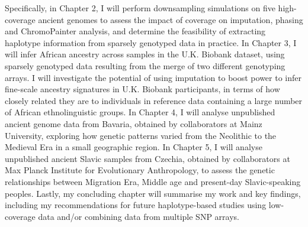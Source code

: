 Specifically, in Chapter 2, I will perform downsampling simulations on five high-coverage ancient genomes to assess the impact of coverage on imputation, phasing and ChromoPainter analysis, and determine the feasibility of extracting haplotype information from sparsely genotyped data in practice. In Chapter 3, I will infer African ancestry across samples in the U.K. Biobank dataset, using sparsely genotyped data resulting from the merge of two different genotyping arrays. I will investigate the potential of using imputation to boost power to infer fine-scale ancestry signatures in U.K. Biobank participants, in terms of how closely related they are to individuals in reference data containing a large number of African ethnolinguistic groups. In Chapter 4, I will analyse unpublished ancient genome data from Bavaria, obtained by collaborators at Mainz University, exploring how genetic patterns varied from the Neolithic to the Medieval Era in a small geographic region. In Chapter 5, I will analyse unpublished ancient Slavic samples from Czechia, obtained by collaborators at Max Planck Institute for Evolutionary Anthropology, to assess the genetic relationships between Migration Era, Middle age and present-day Slavic-speaking peoples. Lastly, my concluding chapter will summarise my work and key findings, including my recommendations for future haplotype-based studies using low-coverage data and/or combining data from multiple SNP arrays.




